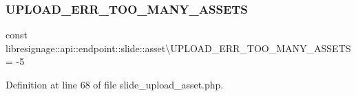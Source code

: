 \subsubsection{\texorpdfstring{U\+P\+L\+O\+A\+D\+\_\+\+E\+R\+R\+\_\+\+T\+O\+O\+\_\+\+M\+A\+N\+Y\+\_\+\+A\+S\+S\+E\+TS}{UPLOAD\_ERR\_TOO\_MANY\_ASSETS}}
{\footnotesize\ttfamily const libresignage\+::api\+::endpoint\+::slide\+::asset\textbackslash{}\+U\+P\+L\+O\+A\+D\+\_\+\+E\+R\+R\+\_\+\+T\+O\+O\+\_\+\+M\+A\+N\+Y\+\_\+\+A\+S\+S\+E\+TS = -\/5}



Definition at line 68 of file slide\+\_\+upload\+\_\+asset.\+php.

